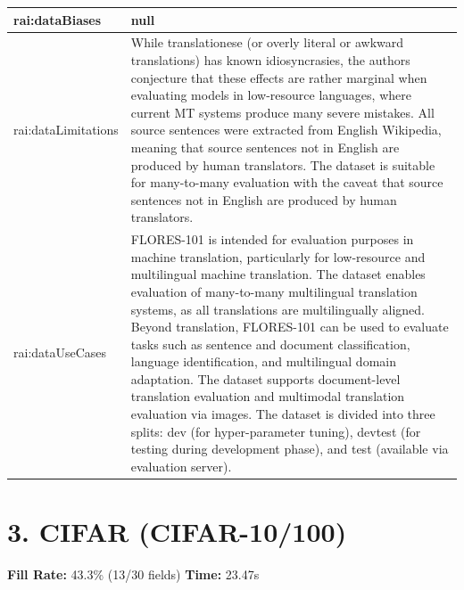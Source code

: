 \documentclass[10pt,a4paper]{article}
\begin{document}
\begin{longtable}{|p{4cm}|p{12cm}|}
\hline
rai:dataBiases & null \\
\hline
rai:dataLimitations & While translationese (or overly literal or awkward translations) has known idiosyncrasies, the authors conjecture that these effects are rather marginal when evaluating models in low-resource languages, where current MT systems produce many severe mistakes. All source sentences were extracted from English Wikipedia, meaning that source sentences not in English are produced by human translators. The dataset is suitable for many-to-many evaluation with the caveat that source sentences not in English are produced by human translators. \\
\hline
rai:dataUseCases & FLORES-101 is intended for evaluation purposes in machine translation, particularly for low-resource and multilingual machine translation. The dataset enables evaluation of many-to-many multilingual translation systems, as all translations are multilingually aligned. Beyond translation, FLORES-101 can be used to evaluate tasks such as sentence and document classification, language identification, and multilingual domain adaptation. The dataset supports document-level translation evaluation and multimodal translation evaluation via images. The dataset is divided into three splits: dev (for hyper-parameter tuning), devtest (for testing during development phase), and test (available via evaluation server). \\
\hline
\end{longtable}

\newpage

\section*{3. CIFAR (CIFAR-10/100)}
\textbf{Fill Rate:} 43.3\% (13/30 fields) \quad \textbf{Time:} 23.47s
\end{document}
